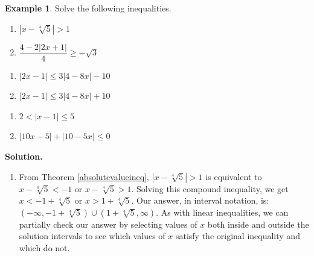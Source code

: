 \documentclass[11pt]{article}
\theoremstyle{definition}  %
\newtheorem{ex}{\bf Example}
\newcounter{HW}
\begin{document}
\begin{ex}  Solve the following inequalities.

\begin{multicols}{2}
\begin{enumerate}

\item  $\left|x-\sqrt[4]{5} \right| > 1$

\item  $\dfrac{4 - 2|2x+1|}{4} \geq -\sqrt{3}$

\setcounter{HW}{\value{enumi}}
\end{enumerate}
\end{multicols}

\begin{multicols}{2}
\begin{enumerate}
\setcounter{enumi}{\value{HW}}

\item  $|2x - 1| \leq 3|4 - 8x| - 10$

\item  $|2x - 1| \leq 3|4 - 8x| + 10$

\setcounter{HW}{\value{enumi}}
\end{enumerate}
\end{multicols}

\begin{multicols}{2}
\begin{enumerate}
\setcounter{enumi}{\value{HW}}



\item  $2 < |x-1| \leq 5$

\item  $|10 x - 5| +|10 - 5x| \leq 0$


\setcounter{HW}{\value{enumi}}
\end{enumerate}
\end{multicols}

{\bf Solution.}  

\begin{enumerate}

\item  From Theorem \ref{absolutevalueineq}, $\left|x-\sqrt[4]{5} \right| > 1$ is equivalent to $x-\sqrt[4]{5} < -1$ or $x-\sqrt[4]{5} > 1$. Solving this compound inequality, we get $x < -1 + \sqrt[4]{5}$ or $x > 1 + \sqrt[4]{5}$.  Our answer, in interval notation, is:  $\left(-\infty,-1 + \sqrt[4]{5} \right) \cup \left(1 + \sqrt[4]{5},\infty \right)$.  As with linear inequalities, we can partially check our answer by selecting values of $x$ both inside and outside the solution intervals to see which values of $x$ satisfy the original inequality and which do not.


\end{enumerate}
\end{ex}
\end{document}
